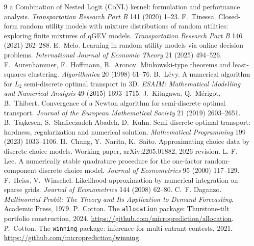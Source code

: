 \documentclass[12pt]{article}
\theoremstyle{remark}
\begin{document}
\begin{thebibliography}{9}
a Combination of Nested Logit (CoNL) kernel: formulation and
performance analysis. \emph{Transportation Research Part B} 141 (2020)
1--23.
 F.~Tinessa. Closed-form random
utility models with mixture distributions of random utilities:
exploring finite mixtures of qGEV models. \emph{Transportation
Research Part B} 146 (2021) 262--288.
 E.~Melo. Learning in random utility
models via online decision problems. \emph{International Journal of
Economic Theory} 21 (2025) 494--526.
 F.~Aurenhammer, F.~Hoffmann, B.~Aronov.
Minkowski-type theorems and least-squares clustering.
\emph{Algorithmica} 20 (1998) 61--76.
 B.~L\'evy. A numerical algorithm for
$L_2$ semi-discrete optimal transport in 3D. \emph{ESAIM: Mathematical
Modelling and Numerical Analysis} 49 (2015) 1693--1715.
 J.~Kitagawa, Q.~M\'erigot, B.~Thibert. Convergence of
a Newton algorithm for semi-discrete optimal transport. \emph{Journal
of the European Mathematical Society} 21 (2019) 2603--2651.
 B.~Ta\c{s}kesen, S.~Shafieezadeh-Abadeh,
D.~Kuhn. Semi-discrete optimal transport: hardness, regularization and
numerical solution. \emph{Mathematical Programming} 199 (2023)
1033--1106.
H.~Chang, Y.~Narita, K.~Saito. Approximating choice data by discrete
choice models. Working paper, arXiv:2205.01882, 2026 revision.
 L.-F. Lee. A numerically stable quadrature
procedure for the one-factor random-component discrete choice model.
\emph{Journal of Econometrics} 95 (2000) 117--129.
 F.~Heiss, V.~Winschel.
Likelihood approximation by numerical integration on sparse grids.
\emph{Journal of Econometrics} 144 (2008) 62--80.
 C.~F. Daganzo. \emph{Multinomial
Probit: The Theory and Its Application to Demand Forecasting}. Academic
Press, 1979.
 P.~Cotton. The
\texttt{allocation} package: Thurstone-tilt portfolio construction,
2024. \url{https://github.com/microprediction/allocation}.
 P.~Cotton. The \texttt{winning} package: inference for multi-entrant contests,
2021. \url{https://github.com/microprediction/winning}.

\end{thebibliography}
\end{document}
